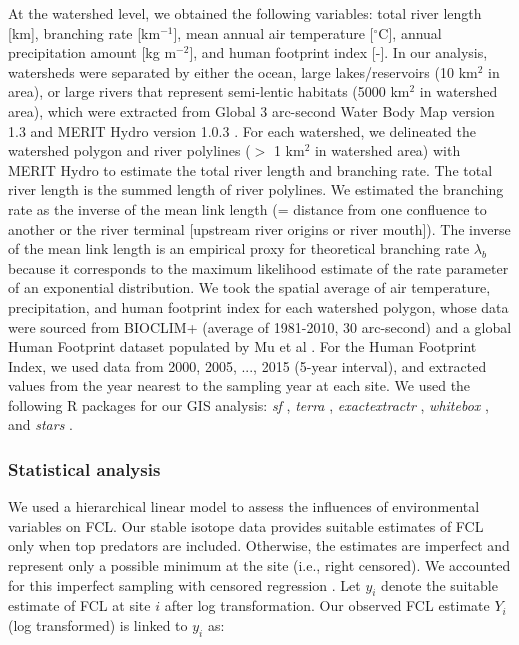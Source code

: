 \documentclass[11pt, class=article, crop=false]{standalone}
\begin{document}
At the watershed level, we obtained the following variables: total river length [km], branching rate [km$^{-1}$], mean annual air temperature [$^\circ$C], annual precipitation amount [kg m$^{-2}$], and human footprint index [-].
In our analysis, watersheds were separated by either the ocean, large lakes/reservoirs (10 km$^{2}$ in area), or large rivers that represent semi-lentic habitats (5000 km$^{2}$ in watershed area), which were extracted from Global 3 arc-second Water Body Map version 1.3 \citep{yamazaki_development_2015} and MERIT Hydro version 1.0.3 \citep{yamazaki_merit_2019}.
For each watershed, we delineated the watershed polygon and river polylines ($>$ 1 km$^2$ in watershed area) with MERIT Hydro to estimate the total river length and branching rate.
The total river length is the summed length of river polylines.
We estimated the branching rate as the inverse of the mean link length (= distance from one confluence to another or the river terminal [upstream river origins or river mouth]).
The inverse of the mean link length is an empirical proxy for theoretical branching rate $\lambda_b$ because it corresponds to the maximum likelihood estimate of the rate parameter of an exponential distribution.
We took the spatial average of air temperature, precipitation, and human footprint index for each watershed polygon, whose data were sourced from BIOCLIM+ (average of 1981-2010, 30 arc-second) \citep{brun_global_2022} and a global Human Footprint dataset populated by Mu et al \citep{mu_global_2022}.
For the Human Footprint Index, we used data from 2000, 2005, ..., 2015 (5-year interval), and extracted values from the year nearest to the sampling year at each site.
We used the following R packages for our GIS analysis: \textit{sf} \citep{pebesma_simple_2018}, \textit{terra} \citep{hijmans_terra_2022}, \textit{exactextractr} \citep{baston_exactextractr_2020}, \textit{whitebox} \citep{lindsay_whitebox_2016}, and \textit{stars} \citep{pebesma_stars_2020}.

\subsubsection{Statistical analysis}

We used a hierarchical linear model to assess the influences of environmental variables on FCL.
Our stable isotope data provides suitable estimates of FCL only when top predators are included.
Otherwise, the estimates are imperfect and represent only a possible minimum at the site (i.e., right censored).
We accounted for this imperfect sampling with censored regression \citep{terui_stream_2018, lunn_bugs_2012}.
Let $y_i$ denote the suitable estimate of FCL at site $i$ after log transformation.
Our observed FCL estimate $Y_i$ (log transformed) is linked to $y_i$ as:
\end{document}
